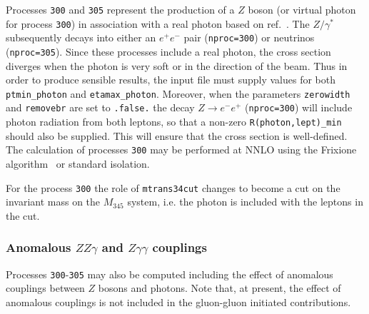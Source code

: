 \documentclass{article}
\begin{document}
{{{{{{Processes {\tt 300} and {\tt 305} represent the production of a $Z$ boson (or virtual photon for process {\tt 300})
in association with a real photon based on ref.~\cite{Campbell:2017aul}. The $Z/\gamma^*$ subsequently decays into 
either an $e^+ e^-$ pair ({\tt nproc=300}) or neutrinos ({\tt nproc=305}).
Since these processes include a real photon, the cross section diverges
when the photon is very soft or in the direction of the beam.
Thus in order to produce sensible results, the input file must supply values for both
{\tt ptmin\_photon} and {\tt etamax\_photon}. Moreover, when the parameters {\tt zerowidth}
and {\tt removebr} are set to {\tt .false.} the decay $Z \to e^- e^+$ ({\tt nproc=300})
will include photon radiation from both leptons, so that a non-zero {\tt R(photon,lept)\_min}
should also be supplied. This will ensure that the cross section is well-defined.
The calculation of processes {\tt 300} may be performed
at NNLO using the Frixione algorithm~\cite{Frixione:1998jh} or standard isolation. 

For the process {\tt 300}  the role of {\tt mtrans34cut} changes to become a cut 
on the invariant mass on the $M_{345}$ system, i.e. the photon is included with the leptons in the cut. 

\subsubsection{Anomalous $ZZ\gamma$ and $Z\gamma\gamma$ couplings}
Processes {\tt 300}-{\tt 305} may also be computed including the effect of anomalous couplings between $Z$ bosons and photons.
Note that, at present, the effect of anomalous couplings is not included in the gluon-gluon
initiated contributions.

}}}}}}
\end{document}
